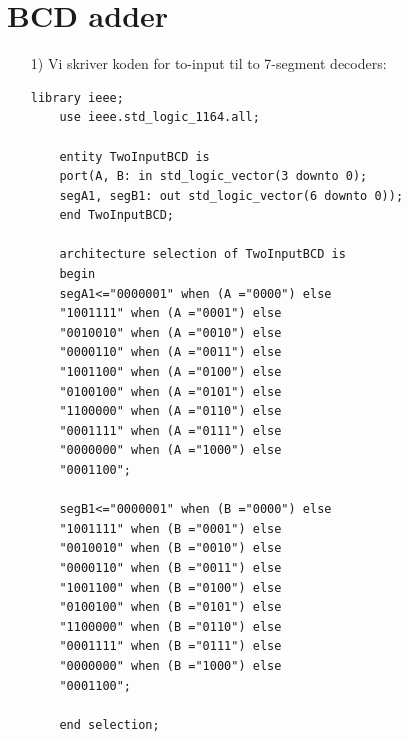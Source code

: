 \section{BCD adder}
\FloatBarrier
\begin{enumerate}
	\item[1)]
	Vi skriver koden for to-input til to 7-segment decoders:
		\begin{lstlisting}[caption={To-input til to 7 segment decoder},label={lst:TwoBcdToTwo7SegDecoder}]
	library ieee;
	use ieee.std_logic_1164.all;
	
	entity TwoInputBCD is
	port(A, B: in std_logic_vector(3 downto 0);
	segA1, segB1: out std_logic_vector(6 downto 0));
	end TwoInputBCD;
	
	architecture selection of TwoInputBCD is
	begin
	segA1<="0000001" when (A ="0000") else
	"1001111" when (A ="0001") else
	"0010010" when (A ="0010") else
	"0000110" when (A ="0011") else
	"1001100" when (A ="0100") else
	"0100100" when (A ="0101") else
	"1100000" when (A ="0110") else
	"0001111" when (A ="0111") else
	"0000000" when (A ="1000") else
	"0001100";
	
	segB1<="0000001" when (B ="0000") else
	"1001111" when (B ="0001") else
	"0010010" when (B ="0010") else
	"0000110" when (B ="0011") else
	"1001100" when (B ="0100") else
	"0100100" when (B ="0101") else
	"1100000" when (B ="0110") else
	"0001111" when (B ="0111") else
	"0000000" when (B ="1000") else
	"0001100";
	
	end selection;
		\end{lstlisting}
	

\end{enumerate}
